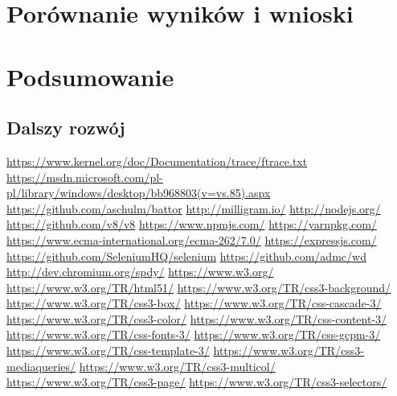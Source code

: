 \documentclass[polish, twoside, 12pt]{mwart}
\let\stdsection\section
\renewcommand*{\section}{\clearpage\stdsection}
\begin{document}
\section{Porównanie wyników i wnioski}

\section{Podsumowanie}

\subsection{Dalszy rozwój}

\begin{thebibliography}{11}
    \url{https://www.kernel.org/doc/Documentation/trace/ftrace.txt}
    \url{https://msdn.microsoft.com/pl-pl/library/windows/desktop/bb968803(v=vs.85).aspx}
    \url{https://github.com/aschulm/battor}
    \url{http://milligram.io/}
    \url{http://nodejs.org/}
    \url{https://github.com/v8/v8}
    \url{https://www.npmjs.com/}
    \url{https://yarnpkg.com/}
    \url{https://www.ecma-international.org/ecma-262/7.0/}
    \url{https://expressjs.com/}
    \url{https://github.com/SeleniumHQ/selenium}
    \url{https://github.com/admc/wd}
    \url{http://dev.chromium.org/spdy/}
    \url{https://www.w3.org/}
    \url{https://www.w3.org/TR/html51/}
    \url{https://www.w3.org/TR/css3-background/}
    \url{https://www.w3.org/TR/css3-box/}
    \url{https://www.w3.org/TR/css-cascade-3/}
    \url{https://www.w3.org/TR/css3-color/}
    \url{https://www.w3.org/TR/css-content-3/}
    \url{https://www.w3.org/TR/css-fonts-3/}
    \url{https://www.w3.org/TR/css-gcpm-3/}
    \url{https://www.w3.org/TR/css-template-3/}
    \url{https://www.w3.org/TR/css3-mediaqueries/}
    \url{https://www.w3.org/TR/css3-multicol/}
    \url{https://www.w3.org/TR/css3-page/}
    \url{https://www.w3.org/TR/css3-selectors/}

\end{thebibliography}
\end{document}

